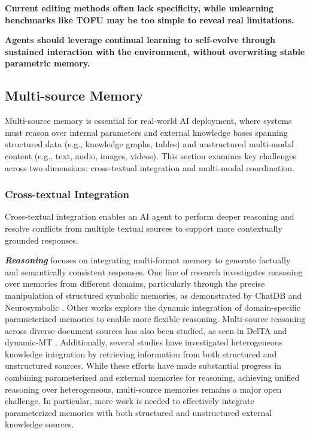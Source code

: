 \documentclass[manuscript,screen]{acmart}
\begin{document}
\begin{tcolorbox}[
    colback=parametriccolor!30!white,
    colframe=black!50,
    arc=6pt,
    boxrule=0.8pt,
    width=\linewidth,
    enhanced,
    left=4pt,
    right=4pt,
    top=4pt,
    bottom=4pt,
    fontupper=\small\bfseries
]
\lightbulb \textbf{Current editing methods often lack specificity, while unlearning benchmarks like TOFU may be too simple to reveal real limitations.}

\lightbulb \textbf{Agents should leverage continual learning to self-evolve through sustained interaction with the environment, without overwriting stable parametric memory.}


\end{tcolorbox}
\subsection{Multi-source Memory}
Multi-source memory is essential for real-world AI deployment, where systems must reason over internal parameters and external knowledge bases spanning structured data (e.g., knowledge graphs, tables) and unstructured multi-modal content (e.g., text, audio, images, videos). This section examines key challenges across two dimensions: cross-textual integration and multi-modal coordination. 

\subsubsection{Cross-textual Integration}
Cross-textual integration enables an AI agent to perform deeper reasoning and resolve conflicts from multiple textual sources to support more contextually grounded responses.

\textit{\textbf{Reasoning}} focuses on integrating multi-format memory to generate factually and semantically consistent responses. One line of research investigates reasoning over memories from different domains, particularly through the precise manipulation of structured symbolic memories, as demonstrated by ChatDB \citep{hu2023chatdb} and Neurosymbolic \citep{wang2024symbolic}. Other works \citep{nogueira-dos-santos-etal-2024-memory, wu-etal-2022-efficient} explore the dynamic integration of domain-specific parameterized memories to enable more flexible reasoning. Multi-source reasoning across diverse document sources has also been studied, as seen in DelTA \citep{wang2025delta} and dynamic-MT \citep{du-etal-2022-dynamic}. Additionally, several studies \citep{li2024structrag, DBLP:conf/acl/LeePF024, zhao2024divknowqa, xu2024generate} have investigated heterogeneous knowledge integration by retrieving information from both structured and unstructured sources. While these efforts have made substantial progress in combining parameterized and external memories for reasoning, achieving unified reasoning over heterogeneous, multi-source memories remains a major open challenge. In particular, more work is needed to effectively integrate parameterized memories with both structured and unstructured external knowledge sources.
\end{document}
